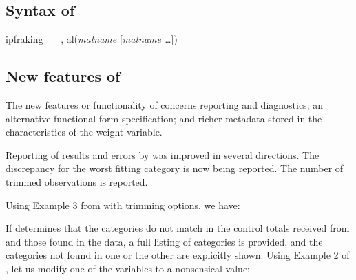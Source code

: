 \subsection{Syntax of }
\label{subsec:syntax}

\begin{stsyntax}
ipfraking
\optif\
\optin\
\optweight\
,
al({\it matname} [{\it matname \ldots}])
\end{stsyntax}

\subsection{New features of }
\label{subsec:example:meta}

The new features or functionality of  concerns reporting and diagnostics;
an alternative functional form specification; and richer metadata stored in the characteristics
of the weight variable.

Reporting of results and errors by \stcmd{ipfraking} was improved in several directions.
The discrepancy for the worst fitting category is now being reported.
The number of trimmed observations is reported.

Using Example 3 from \citet{kolenikov:2014} with trimming options,
we have:


\begin{stlog}
\nullskip
\end{stlog}


If  determines that the categories do not match
in the control totals received from  and those found in
the data, a full listing of categories is provided, and the categories
not found in one or the other are explicitly shown. Using Example 2 of
\citet{kolenikov:2014}, let us modify one of the variables to a nonsensical value:

\label{page:mismatch}

\begin{stlog}

\end{stlog}

